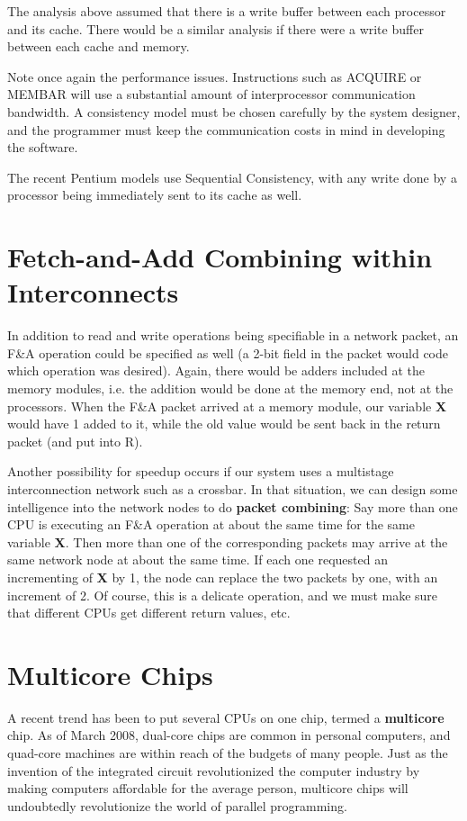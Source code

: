 The analysis above assumed that there is a write buffer between each
processor and its cache.  There would be a similar analysis if there
were a write buffer between each cache and memory.

Note once again the performance issues.  Instructions such as ACQUIRE or
MEMBAR will use a substantial amount of interprocessor communication
bandwidth.  A consistency model must be chosen carefully by the system
designer, and the programmer must keep the communication costs in mind
in developing the software.

The recent Pentium models use Sequential Consistency, with any write
done by a processor being immediately sent to its cache as well.

\section{Fetch-and-Add Combining within Interconnects}

In addition to read and write operations being specifiable in a network
packet, an F\&A operation could be specified as well (a 2-bit field in
the packet would code which operation was desired). Again, there would
be adders included at the memory modules, i.e. the addition would be
done at the memory end, not at the processors. When the F\&A packet
arrived at a memory module, our variable  {\bf X} would have 1 added to
it, while the old value would be sent back in the return packet (and put
into R).

Another possibility for speedup occurs if our system uses a multistage
interconnection network such as a crossbar.  In that situation, we can
design some intelligence into the network nodes to do {\bf packet
combining}: Say more than one CPU is executing an F\&A operation at
about the same time for the same variable {\bf X}.  Then more than one
of the corresponding packets may arrive at the same network node at
about the same time.  If each one requested an incrementing of {\bf X}
by 1, the node can replace the two packets by one, with an increment of
2.  Of course, this is a delicate operation, and we must make sure that
different CPUs get different return values, etc.

\section{Multicore Chips}

A recent trend has been to put several CPUs on one chip, termed a {\bf
multicore} chip.  As of March 2008, dual-core chips are common in
personal computers, and quad-core machines are within reach of the
budgets of many people.  Just as the invention of the integrated circuit
revolutionized the computer industry by making computers affordable for
the average person, multicore chips will undoubtedly revolutionize the
world of parallel programming.

